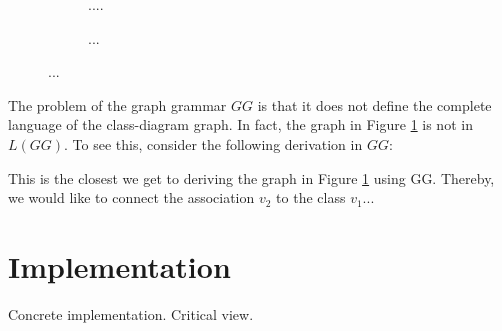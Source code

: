 \documentclass[]{report}
\begin{document}
\begin{figure}[h]
	\begin{subfigure}[t]{0.3\textwidth}
		\centering
		
		\caption{....}
		\label{fig:classdiagram-g}
	\end{subfigure}
	\begin{subfigure}[t]{0.68\textwidth}
		\centering
		
		\caption{...}
		\label{fig:classdiagram-gg}
	\end{subfigure}
	\caption{...}
\end{figure}

The problem of the graph grammar $GG$ is that it does not define the complete language of the class-diagram graph. In fact, the graph in Figure \ref{fig:classdiagram-g} is not in $L(GG)$. To see this, consider the following derivation in $GG$:


This is the closest we get to deriving the graph in Figure \ref{fig:classdiagram-g} using GG. Thereby, we would like to connect the association $v_2$ to the class $v_1$...




\section{Implementation}
Concrete implementation. Critical view.

\end{document}
